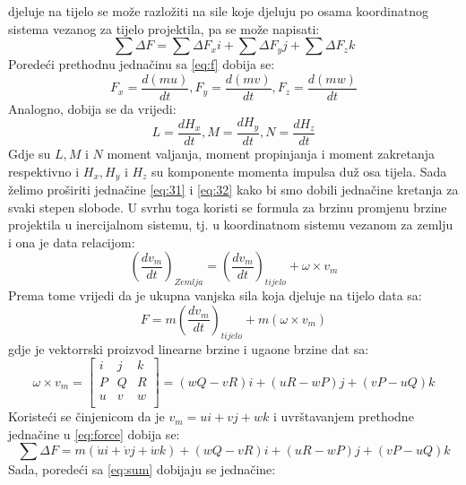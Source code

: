 djeluje na tijelo se može razložiti na sile koje djeluju po osama koordinatnog sistema 
vezanog za tijelo projektila, pa se može napisati:
\begin{equation}
    \sum \Delta F=\sum \Delta  F_xi+\sum \Delta  F_yj+\sum \Delta  F_zk
    \label{eq:sum}
\end{equation}
Poredeći prethodnu jednačinu sa \ref{eq:f} dobija se:
\begin{equation}
    F_x=\frac{d(mu)}{dt}, F_y=\frac{d(mv)}{dt}, F_z=\frac{d(mw)}{dt}
    \label{eq:31}
\end{equation}
Analogno, dobija se da vrijedi:
\begin{equation}
    L=\frac{dH_x}{dt},M=\frac{dH_y}{dt},N=\frac{dH_z}{dt}
    \label{eq:32}
\end{equation}
Gdje su $L,M$ i $N$ moment valjanja, moment propinjanja i moment zakretanja respektivno i 
$H_x, H_y$ i $H_z$ su komponente momenta impulsa duž osa tijela. 
Sada želimo proširiti jednačine \ref{eq:31} i \ref{eq:32} kako bi smo dobili 
jednačine kretanja za svaki stepen slobode. U svrhu toga koristi se formula za 
brzinu promjenu brzine projektila u inercijalnom sistemu, tj. u koordinatnom sistemu 
vezanom za zemlju i ona je data relacijom:
\begin{equation}
    \left( \frac{dv_m}{dt}\right)_{Zemlja}=\left(\frac{dv_m}{dt}\right)_{tijelo}+\omega \times v_m
\end{equation}
Prema tome vrijedi da je ukupna vanjska sila koja djeluje na tijelo data sa:
\begin{equation}
    F=m\left(\frac{dv_m}{dt}\right)_{tijelo}+m(\omega \times v_m)
    \label{eq:force}
\end{equation}
gdje je vektorrski proizvod linearne brzine i ugaone brzine dat sa:
\begin{equation}
    \omega \times v_m=\begin{bmatrix}
        i&j&k\\
        P&Q&R\\
        u&v&w\\
    \end{bmatrix}=(wQ-vR)i+(uR-wP)j+(vP-uQ)k
\end{equation}
Koristeći se činjenicom da je $v_m=ui+vj+wk$ i uvrštavanjem prethodne jednačine u \ref{eq:force} dobija se:
\begin{equation}
    \sum \Delta F=m(\dot{u}i+\dot{v}j+\dot{w}k)+(wQ-vR)i+(uR-wP)j+(vP-uQ)k
\end{equation}
Sada, poredeći sa \ref{eq:sum} dobijaju se jednačine:

